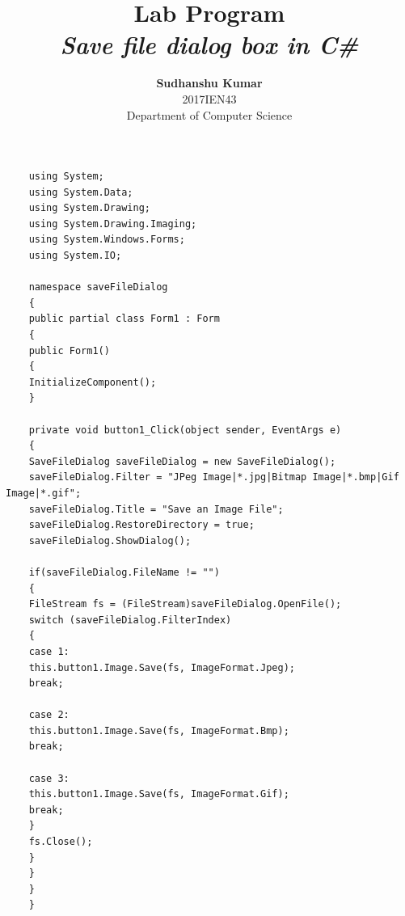 \documentclass[11pt]{article}
\title{\textbf{Lab Program}\\
\emph{Save file dialog box in C\#}}
\author{\textbf{Sudhanshu Kumar}\\
2017IEN43\\
Department of Computer Science}
\begin{document}
	\maketitle\break
	\begin{verbatim}
	using System;
	using System.Data;
	using System.Drawing;
	using System.Drawing.Imaging;
	using System.Windows.Forms;
	using System.IO;
	
	namespace saveFileDialog
	{
	public partial class Form1 : Form
	{
	public Form1()
	{
	InitializeComponent();
	}
	
	private void button1_Click(object sender, EventArgs e)
	{
	SaveFileDialog saveFileDialog = new SaveFileDialog();
	saveFileDialog.Filter = "JPeg Image|*.jpg|Bitmap Image|*.bmp|Gif Image|*.gif";
	saveFileDialog.Title = "Save an Image File";
	saveFileDialog.RestoreDirectory = true;
	saveFileDialog.ShowDialog();
	
	if(saveFileDialog.FileName != "")
	{
	FileStream fs = (FileStream)saveFileDialog.OpenFile();
	switch (saveFileDialog.FilterIndex)
	{
	case 1:
	this.button1.Image.Save(fs, ImageFormat.Jpeg);
	break;
	
	case 2:
	this.button1.Image.Save(fs, ImageFormat.Bmp);
	break;
	
	case 3:
	this.button1.Image.Save(fs, ImageFormat.Gif);
	break;
	}
	fs.Close();
	}
	}
	}
	}
	
	
	\end{verbatim}\break
\end{document}
